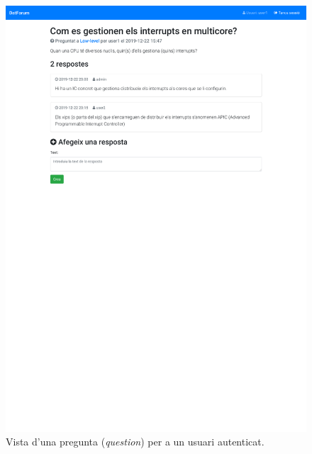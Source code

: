 \documentclass[catalan, a4paper]{scrartcl}
\begin{document}
\begin{figure}
\centering \includegraphics[trim={0 16cm 0 0}, clip, width=.98\columnwidth, cframe=gray]{screens/question_user.pdf}
\caption{\label{fig:question_user} Vista d'una pregunta (\emph{question}) per a un usuari autenticat. }
\end{figure}
\end{document}
